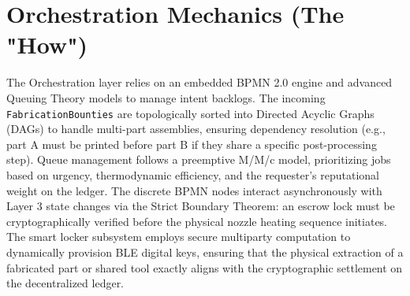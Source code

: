 \section{Orchestration Mechanics (The "How")}
The Orchestration layer relies on an embedded BPMN 2.0 engine and advanced Queuing Theory models to manage intent backlogs. The incoming \texttt{FabricationBounties} are topologically sorted into Directed Acyclic Graphs (DAGs) to handle multi-part assemblies, ensuring dependency resolution (e.g., part A must be printed before part B if they share a specific post-processing step).
Queue management follows a preemptive M/M/c model, prioritizing jobs based on urgency, thermodynamic efficiency, and the requester's reputational weight on the ledger. The discrete BPMN nodes interact asynchronously with Layer 3 state changes via the Strict Boundary Theorem: an escrow lock must be cryptographically verified before the physical nozzle heating sequence initiates. The smart locker subsystem employs secure multiparty computation to dynamically provision BLE digital keys, ensuring that the physical extraction of a fabricated part or shared tool exactly aligns with the cryptographic settlement on the decentralized ledger.
